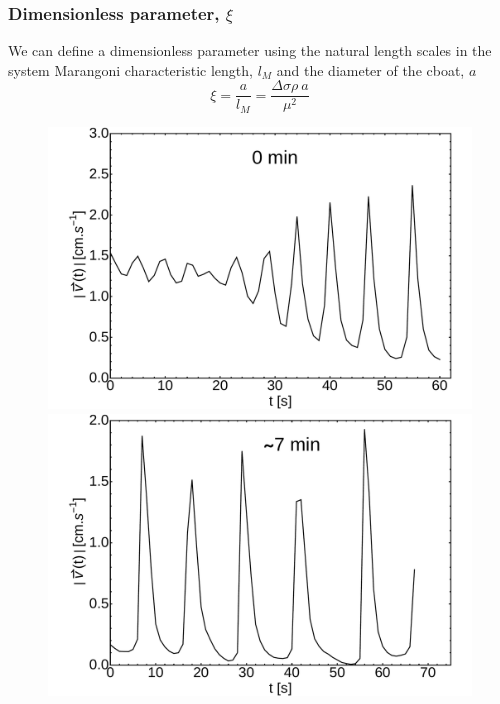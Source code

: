 \documentclass[journal=langd5, manuscript=article, layout=onecolumn]{achemso}
\begin{document}
\subsubsection{Dimensionless parameter, $\xi$}
We can define a dimensionless parameter using the natural length scales in the system Marangoni characteristic length, $l_{M}$ and the diameter of the cboat, $a$
\begin{equation}
\xi = \frac{a}{l_{M}} = \frac{\Delta\sigma\rho\ a}{\mu^{2}}
\end{equation}
\begin{figure}[ht]
    \centering
	\begin{minipage}[c]{0.3\linewidth}
		\centering
		\includegraphics[width=\textwidth]{uvst_65dypcm_a.pdf}
	\end{minipage}
	\begin{minipage}[c]{0.3\linewidth}
		\centering
		\includegraphics[width=\textwidth]{uvst_65dypcm_b.pdf}

\end{minipage}
\end{figure}
\end{document}
